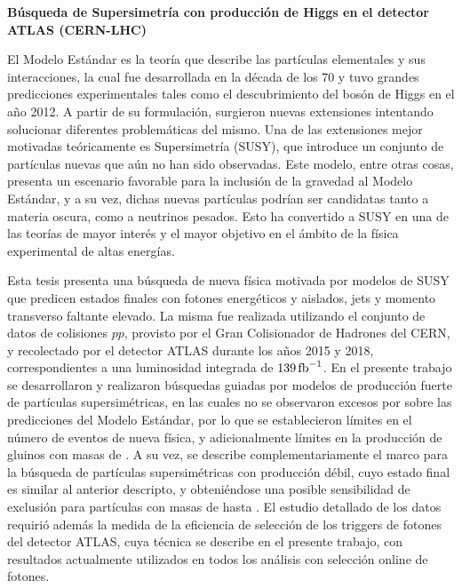 \thispagestyle{empty}

{\centering \bf \Large  Búsqueda de Supersimetría con producción de Higgs en el detector ATLAS (CERN-LHC)\\}

\vspace{2cm}

El Modelo Estándar es la teoría que describe las partículas elementales y sus interacciones, la cual fue desarrollada en la década de los 70 y tuvo grandes predicciones experimentales tales como el descubrimiento del bosón de Higgs en el año 2012. A partir de su formulación, surgieron nuevas extensiones intentando solucionar diferentes problemáticas del mismo. Una de las extensiones mejor motivadas teóricamente es Supersimetría (SUSY), que introduce un conjunto de partículas nuevas que aún no han sido observadas. Este modelo, entre otras cosas, presenta un escenario favorable para la inclusión de la gravedad al Modelo Estándar, y a su vez, dichas nuevas partículas podrían ser candidatas tanto a materia oscura, como a neutrinos pesados. Esto ha convertido a SUSY en una de las teorías de mayor interés y el mayor objetivo en el ámbito de la física experimental de altas energías.

Esta tesis presenta una búsqueda de nueva física motivada por modelos de SUSY que predicen estados finales con fotones energéticos y aislados, jets y momento transverso faltante elevado. La misma fue realizada utilizando el conjunto de datos de colisiones $pp$, provisto por el Gran Colisionador de Hadrones del CERN, y recolectado por el detector ATLAS durante los años 2015 y 2018, correspondientes a una luminosidad integrada de $139\,\text{fb}^{-1}$. En el presente trabajo se desarrollaron y realizaron búsquedas guiadas por modelos de producción fuerte de partículas supersimétricas, en las cuales no se observaron excesos por sobre las predicciones del Modelo Estándar, por lo que se establecieron límites en el número de eventos de nueva física, y adicionalmente límites en la producción de gluinos con masas de . A su vez, se describe complementariamente el marco para la búsqueda de partículas supersimétricas con producción débil, cuyo estado final es similar al anterior descripto, y obteniéndose una posible sensibilidad de exclusión para partículas con masas de hasta . El estudio detallado de los datos requirió además la medida de la eficiencia de selección de los triggers de fotones del detector ATLAS, cuya técnica se describe en el presente trabajo, con resultados actualmente utilizados en todos los análisis con selección online de fotones.

